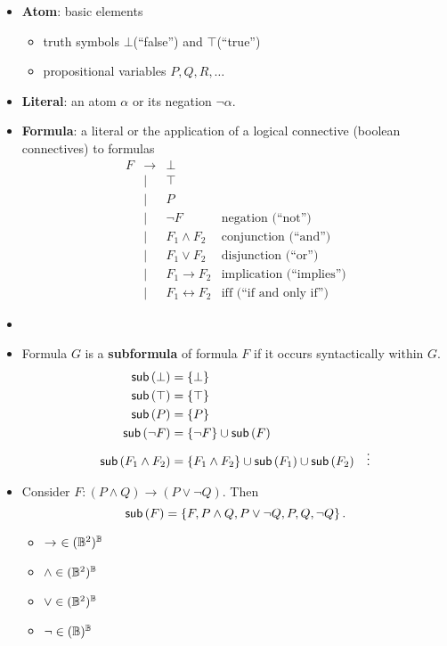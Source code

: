\begin{itemize}
	\item \textbf{Atom}: basic elements
	\begin{itemize}
		\item truth symbols $\bot$(``false'') and $\top$(``true'')
		\item propositional variables $P,Q,R,\dots$
	\end{itemize}
	\item \textbf{Literal}: an atom $\alpha$ or its negation $\lnot\alpha$.
	\item \textbf{Formula}: a literal or the application of a logical connective (boolean connectives) to formulas
	\[
	\begin{array}{ccll}
		F & \to & \bot \\
		& | & \top \\
		& | & P \\
		& | & \lnot F & \text{negation (``not'')} \\
		& | & F_1\land F_2 & \text{conjunction (``and'')} \\
		& | & F_1\lor F_2 & \text{disjunction (``or'')} \\
		& | & F_1\to F_2 & \text{implication (``implies'')} \\
		& | & F_1\leftrightarrow F_2 & \text{iff (``if and only if'')}
	\end{array}
	\]
	\item[]
	\item Formula $G$ is a \textbf{subformula} of formula $F$ if it occurs syntactically within $G$.
	\begin{align*}
		\textsf{sub}\left(\bot\right) &= \set{\bot} \\
		\textsf{sub}\left(\top\right) &= \set{\top} \\
		\textsf{sub}\left(P\right) &= \set{P} \\
		\textsf{sub}\left(\lnot F\right) &= \set{\lnot F}\cup\textsf{sub}\left(F\right) \\
		\textsf{sub}\left(F_1\land F_2\right) &= \set{F_1\land F_2}\cup\textsf{sub}\left(F_1\right)\cup\textsf{sub}\left(F_2\right)
		&\vdots
	\end{align*}
	\item Consider $F:(P\land Q)\to (P\lor\lnot Q)$. Then \[
	\textsf{sub}\left(F\right)=\set{F,P\land Q,P\lor\lnot Q,P,Q,\lnot Q}.
	\]
	\begin{itemize}
		\item $\to\ \in (\mathbb{B}^2)^{\mathbb{B}}$
		\item $\land \in (\mathbb{B}^2)^{\mathbb{B}}$
		\item $\lor \in (\mathbb{B}^2)^{\mathbb{B}}$
		\item $\lnot \in (\mathbb{B})^{\mathbb{B}}$
	\end{itemize}

\end{itemize}
